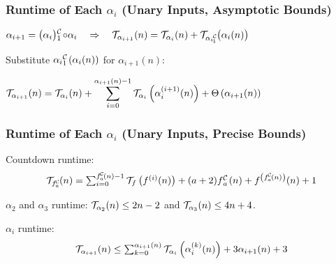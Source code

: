 \begin{frame}
\frametitle{Runtime of Each $\alpha_i$ (Unary Inputs, Asymptotic Bounds)}

$\displaystyle
\alpha_{i+1} = \cdt{\big(\alpha_i\big)}{1}\circ \alpha_i
\quad \implies \quad \runtime_{\alpha_{i+1}}(n) = \runtime_{\alpha_i}(n) + \runtime_{\cdt{\alpha_i}{1}}\big(\alpha_i(n)\big)
$

\smallskip
\pause 
{}

\bigskip

\pause 
Substitute $\cdt{\alpha_i}{1}(\alpha_i(n))$ for $\alpha_{i+1}(n)$:
\bigskip

$ \displaystyle 
\mathcal{T}_{\alpha_{i+1}}(n)
  = \mathcal{T}_{\alpha_i}(n) + 
  \sum_{i=0}^{\alpha_{i+1}(n) - 1} \mathcal{T}_{\alpha_i}\left(\alpha_i^{(i+1)}(n)\right) + \Theta\left(\alpha_{i+1}(n) \right)
$

\pause 
\smallskip
{}

\end{frame}


\begin{frame}
\frametitle{Runtime of Each $\alpha_i$ (Unary Inputs, Precise Bounds)}

Countdown runtime:
\begin{equation*}
\textstyle \runtime_{\cdt{f}{a}}(n) =
\sum_{i=0}^{\cdt{f}{a}(n) - 1} \runtime_f\left(f^{(i)}(n)\right)
+ (a + 2)\cdt{f}{a}(n) + f^{\left(\cdt{f}{a}(n)\right)}(n) + 1
\end{equation*}

\smallskip

\pause 
$\alpha_2$ and $\alpha_3$ runtime: $\mathcal{T}_{\alpha_2}(n) \le 2n - 2$ and $\mathcal{T}_{\alpha_3}(n) \le 4n + 4$.

\bigskip 

\pause 
$\alpha_i$ runtime:
\begin{equation*}
\textstyle \mathcal{T}_{\alpha_{i+1}}(n) \le \sum_{k=0}^{\alpha_{i+1}(n)}\mathcal{T}_{\alpha_i}\left( \alpha_i^{(k)}(n)\right) + 3\alpha_{i+1}(n) + 3
\end{equation*}

\smallskip

\pause 
{}

\end{frame}



